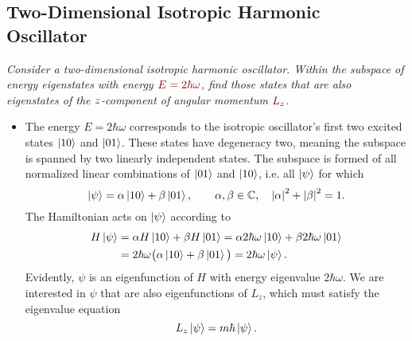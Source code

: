 \documentclass[11pt, a4paper]{article}
\newcommand{\dmath}[1]{\textcolor{Maroon}{#1}}  %
\begin{document}
\subsection{Two-Dimensional Isotropic Harmonic Oscillator} \label{qmv:ss:2dqho}
\textit{Consider a two-dimensional isotropic harmonic oscillator. Within the subspace of energy eigenstates with energy $ \dmath{E = 2\hbar \omega} $, find those states that are also eigenstates of the $ \dmath{z} $-component of angular momentum $ \dmath{L_{z}} $.}
\begin{itemize}
	\item The energy $ E = 2\hbar \omega $ corresponds to the isotropic oscillator's first two excited states $ \ket{10} $ and $ \ket{01} $. These states have degeneracy two, meaning the subspace is spanned by two linearly independent states. The subspace is formed of all normalized linear combinations of $ \ket{01} $ and $ \ket{10} $, i.e. all $ \ket{\psi} $ for which
	\begin{equation*}
		\ket{\psi} = \alpha \ket{10} + \beta \ket{01}, \qquad \alpha, \beta \in \mathbb{C}, \quad \abs{\alpha}^{2} + \abs{\beta}^{2} = 1.
	\end{equation*}
	The Hamiltonian acts on $ \ket{\psi} $ according to
	\begin{align*}
		H \ket{\psi} &= \alpha H \ket{10} + \beta H \ket{01} = \alpha 2\hbar \omega \ket{10} + \beta 2\hbar \omega \ket{01}\\
		&=2\hbar \omega \big(\alpha \ket{10} + \beta \ket{01}\big) = 2\hbar \omega \ket{\psi}.
	\end{align*}
	Evidently, $ \psi $ is an eigenfunction of $ H $ with energy eigenvalue $ 2\hbar \omega $.	We are interested in $ \psi $ that are also eigenfunctions of $ L_{z} $, which must satisfy the eigenvalue equation
	\begin{equation*}
		L_{z}\ket{\psi} = m \hbar \ket{\psi}.
	\end{equation*}
	

\end{itemize}
\end{document}
